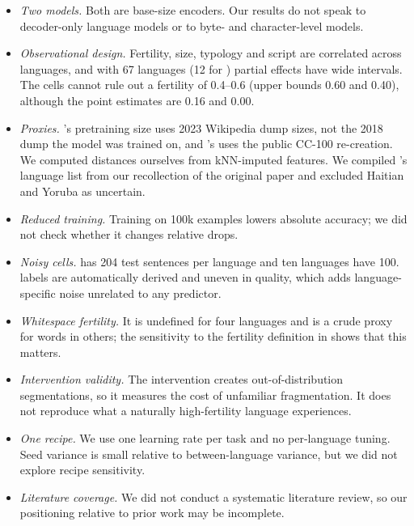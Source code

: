\begin{itemize}[leftmargin=*,itemsep=0pt,topsep=0pt]
    \item \emph{Two models.} Both are base-size encoders. Our results do not speak to decoder-only language models or to byte- and character-level models.
    \item \emph{Observational design.} Fertility, size, typology and script are correlated across languages, and with 67 languages (12 for \xnli) partial effects have wide intervals. The \xnli cells cannot rule out a fertility \rsq of 0.4--0.6 (upper bounds 0.60 and 0.40), although the point estimates are 0.16 and 0.00.
    \item \emph{Proxies.} \mbert's pretraining size uses 2023 Wikipedia dump sizes, not the 2018 dump the model was trained on, and \xlmr's uses the public CC-100 re-creation. We computed \uriel distances ourselves from kNN-imputed features. We compiled \xlmr's language list from our recollection of the original paper and excluded Haitian and Yoruba as uncertain.
    \item \emph{Reduced \xnli training.} Training on 100k examples lowers absolute accuracy; we did not check whether it changes relative drops.
    \item \emph{Noisy cells.} \sib has 204 test sentences per language and ten \wikiann languages have 100. \wikiann labels are automatically derived and uneven in quality, which adds language-specific noise unrelated to any predictor.
    \item \emph{Whitespace fertility.} It is undefined for four languages and is a crude proxy for words in others; the sensitivity to the fertility definition in  shows that this matters.
    \item \emph{Intervention validity.} The intervention creates out-of-distribution segmentations, so it measures the cost of unfamiliar fragmentation. It does not reproduce what a naturally high-fertility language experiences.
    \item \emph{One recipe.} We use one learning rate per task and no per-language tuning. Seed variance is small relative to between-language variance, but we did not explore recipe sensitivity.
    \item \emph{Literature coverage.} We did not conduct a systematic literature review, so our positioning relative to prior work may be incomplete.
\end{itemize}
